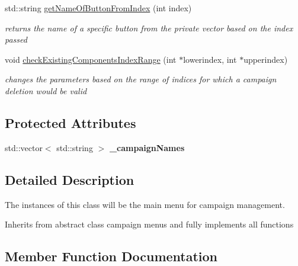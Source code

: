 \begin{DoxyCompactItemize}
\hypertarget{class_campaign_manager_af9bb0ad7faea22b9f3a04ea5d1c78f9b}{}\label{class_campaign_manager_af9bb0ad7faea22b9f3a04ea5d1c78f9b} 
std\+::string \hyperlink{class_campaign_manager_af9bb0ad7faea22b9f3a04ea5d1c78f9b}{get\+Name\+Of\+Button\+From\+Index} (int index)
\begin{DoxyCompactList}\small\item\em returns the name of a specific button from the private vector based on the index passed \end{DoxyCompactList}\item 
\hypertarget{class_campaign_manager_abeb07b6ab983afec3273240134a928b2}{}\label{class_campaign_manager_abeb07b6ab983afec3273240134a928b2} 
void \hyperlink{class_campaign_manager_abeb07b6ab983afec3273240134a928b2}{check\+Existing\+Components\+Index\+Range} (int $\ast$lowerindex, int $\ast$upperindex)
\begin{DoxyCompactList}\small\item\em changes the parameters based on the range of indices for which a campaign deletion would be valid \end{DoxyCompactList}\end{DoxyCompactItemize}
\subsection*{Protected Attributes}
\begin{DoxyCompactItemize}
\item 
\hypertarget{class_campaign_manager_aeb7ea1188d597534f0da5f4a9e3eca16}{}\label{class_campaign_manager_aeb7ea1188d597534f0da5f4a9e3eca16} 
std\+::vector$<$ std\+::string $>$ {\bfseries \+\_\+campaign\+Names}
\end{DoxyCompactItemize}


\subsection{Detailed Description}
The instances of this class will be the main menu for campaign management. 

Inherits from abstract class campaign menus and fully implements all functions 

\subsection{Member Function Documentation}
\hypertarget{class_campaign_manager_af4ec02e5399f2a7bea50454eedd4ea62}{}\label{class_campaign_manager_af4ec02e5399f2a7bea50454eedd4ea62} 
